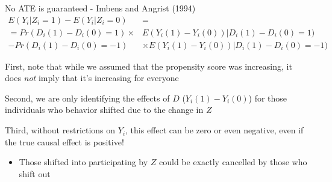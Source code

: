 \documentclass[notes,11pt, aspectratio=169]{beamer}
\newenvironment{wideitemize}{\itemize\addtolength{\itemsep}{10pt}}{\enditemize}
\begin{document}
\begin{frame}{No ATE is guaranteed  - Imbens and Angrist  (1994)}
    \begin{align*}
      E(Y_{i} | Z_{i} = 1) - E(Y_{i} | Z_{i} = 0) &= \\
      = Pr(D_{i}(1) - D_{i}(0) = 1) \times &E(Y_{i}(1) - Y_{i}(0)) | D_{i}(1) - D_{i}(0) = 1) \\
      - Pr(D_{i}(1) - D_{i}(0) = -1)& \times E(Y_{i}(1) - Y_{i}(0)) | D_{i}(1) - D_{i}(0) = -1) 
    \end{align*}
  \begin{wideitemize}
  \item First, note that while we assumed that the propensity score
    was increasing, it does \emph{not} imply that it's increasing for
    everyone
  \item Second, we are only identifying the effects of $D$
    ($Y_{i}(1) - Y_{i}(0)$) for those individuals who behavior shifted
    due to the change in $Z$
  \item Third, without restrictions on $Y_{i}$, this effect can be
    zero or even negative, even if the true causal effect is positive!
    \begin{itemize}
    \item Those shifted into participating by $Z$ could be exactly
      cancelled by those who shift out
    \end{itemize}
  \end{wideitemize}
\end{frame}
\end{document}
